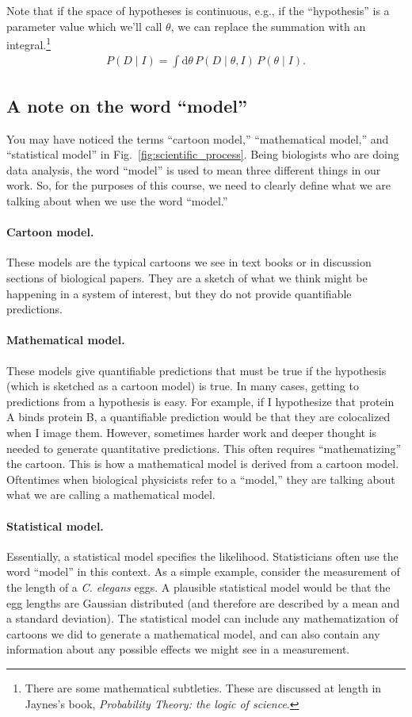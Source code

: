 Note that if the space of hypotheses is continuous, e.g., if the
``hypothesis'' is a parameter value which we'll call $\theta$, we can
replace the summation with an integral.\footnote{There are some
  mathematical subtleties.  These are discussed at length in Jaynes's
  book, \textit{Probability Theory: the logic of science}.}
\begin{align}
P(D\mid I) = \int \mathrm{d}\theta\,P(D\mid \theta, I)\, P(\theta \mid I).
\end{align}

\subsection{A note on the word ``model''}
You may have noticed the terms ``cartoon model,'' ``mathematical model,'' and ``statistical model'' in Fig.~\ref{fig:scientific_process}.  Being biologists who are
doing data analysis, the word ``model'' is used to mean three
different things in our work.  So, for the purposes of this course, we
need to clearly define what we are talking about when we use the word
``model.''

\paragraph{Cartoon model.}  These models are the typical cartoons we see in
text books or in discussion sections of biological papers.  They are a
sketch of what we think might be happening in a system of interest,
but they do not provide quantifiable predictions.

\paragraph{Mathematical model.} These models give quantifiable predictions that
must be true if the hypothesis (which is sketched as a cartoon model) is
true. In many cases, getting to predictions from a hypothesis is easy.
For example, if I hypothesize that protein A binds protein B, a
quantifiable prediction would be that they are colocalized when I
image them.  However, sometimes harder work and deeper thought is
needed to generate quantitative predictions.  This often requires
``mathematizing'' the cartoon.  This is how a mathematical model is derived from
a cartoon model.  Oftentimes when biological physicists refer to a
``model,'' they are talking about what we are calling a mathematical model.

\paragraph{Statistical model.} Essentially, a statistical model specifies the likelihood.
Statisticians often use the word ``model'' in this context.  As a
simple example, consider the measurement of the length of a
\textit{C. elegans} eggs.  A plausible statistical model would be that the egg
lengths are Gaussian distributed (and therefore are described by a
mean and a standard deviation).  The statistical model can include any
mathematization of cartoons we did to generate a mathematical model, and can also
contain any information about any possible effects we might see in a
measurement.



